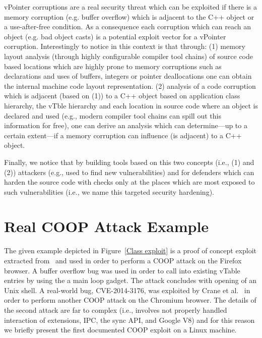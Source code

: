 vPointer corruptions are a real security threat which can be exploited if there 
is a memory corruption (e.g. buffer overflow) which is adjacent to
the C++ object or a use-after-free condition. As a consequence each corruption 
which can reach an object (e.g. bad object casts) is a potential exploit vector 
for a vPointer corruption. Interestingly to notice in this context is that through:
(1) memory layout analysis (through highly configurable compiler tool chains) of 
source code based locations which are highly prone to
memory corruptions such as declarations and uses of buffers, integers or pointer 
deallocations one can obtain the internal machine code layout representation.
(2) analysis of a code corruption which is adjacent (based on (1)) to a C++ object based on
application class hierarchy, the vTble hierarchy and each location in source code where an object
is declared and used (e.g., modern compiler tool chains can spill out this information for free), 
one can derive an analysis which can determine---up to a certain extent---if a memory corruption 
can influence (is adjacent) to a C++ object.

Finally, we notice that by building tools based on this two concepts (i.e., (1) and (2))
attackers (e.g., used to find new vulnerabilities) and for defenders which can 
harden the source code with checks only at the places which are most exposed 
to such vulnerabilities (i.e., we name this targeted security hardening).

\section{Real COOP Attack Example}
\label{Running Example: CVE X}
The given example depicted in Figure~\ref{Class exploit}
is a proof of concept exploit extracted from~\cite{schuster:coop} and used in order to perform 
a COOP attack on the Firefox browser. A buffer overflow bug was used in order to call 
into existing vTable entries by using the a main loop gadget. 
The attack concludes with opening of an Unix shell. 
A real-world bug, CVE-2014-3176, was exploited by Crane et al.~\cite{crane:readactor++}
in order to perform another COOP attack on the Chromium browser. The details of the 
second attack are far to complex (i.e., involves not properly handled interaction of 
extensions, IPC, the sync API, and Google V8) and for this reason we briefly present the first 
documented COOP exploit on a Linux machine.

